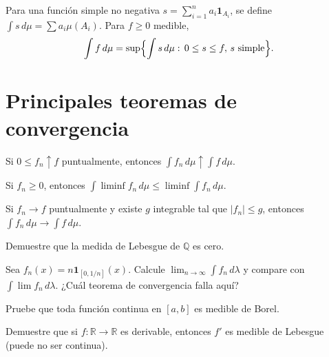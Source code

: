 \begin{definition}
\label{def:integral-lebesgue}
Para una función simple no negativa $s=\sum_{i=1}^{n}a_i\mathbf{1}_{A_i}$, se define $\int s\,d\mu=\sum a_i\mu(A_i)$. Para $f\geq 0$ medible,
\[
  \int f\,d\mu=\sup\Bigl\{\int s\,d\mu:\,0\leq s\leq f,\,s\text{ simple}\Bigr\}.
\]
\end{definition}

\section{Principales teoremas de convergencia}

\begin{theorem}
\label{teo:monotona}
Si $0\leq f_n\uparrow f$ puntualmente, entonces $\int f_n\,d\mu\uparrow\int f\,d\mu$.
\end{theorem}

\begin{theorem}[de Fatou]
\label{teo:fatou}
Si $f_n\geq 0$, entonces $\int\liminf f_n\,d\mu\leq\liminf\int f_n\,d\mu$.
\end{theorem}

\begin{theorem}
\label{teo:dominada}
Si $f_n\to f$ puntualmente y existe $g$ integrable tal que $|f_n|\leq g$, entonces $\int f_n\,d\mu\to\int f\,d\mu$.
\end{theorem}

\begin{exercise}
Demuestre que la medida de Lebesgue de $\mathbb{Q}$ es cero.
\end{exercise}

\begin{exercise}
Sea $f_n(x)=n\mathbf{1}_{[0,1/n]}(x)$. Calcule $\lim_{n\to\infty}\int f_n\,d\lambda$ y compare con $\int\lim f_n\,d\lambda$. ¿Cuál teorema de convergencia falla aquí?
\end{exercise}

\begin{exercise}
Pruebe que toda función continua en $[a,b]$ es medible de Borel.
\end{exercise}

\begin{problem}
Demuestre que si $f\colon\mathbb{R}\to\mathbb{R}$ es derivable, entonces $f'$ es medible de Lebesgue (puede no ser continua).
\end{problem}

